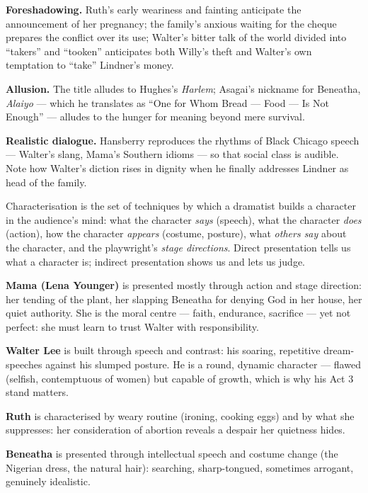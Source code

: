 \documentclass[11pt]{article}
\newcommand{\cle}[1]{{\popxbold\color{popdark}#1}}
\newcounter{popsec}
\newcounter{popsub}
\newcommand{\courssub}[1]{%
  \stepcounter{popsub}%
  \par\vspace{9pt}\noindent{\popxbold\fontsize{11.5}{13}\selectfont\color{popink}{\color{poporange}\thepopsec.\thepopsub}\hspace{6pt}#1}\par\nopagebreak\vspace{4pt}
}
\begin{document}
\textbf{Foreshadowing.} Ruth's early weariness and fainting anticipate the announcement of her pregnancy; the family's anxious waiting for the cheque prepares the conflict over its use; Walter's bitter talk of the world divided into ``takers'' and ``tooken'' anticipates both Willy's theft and Walter's own temptation to ``take'' Lindner's money.

\textbf{Allusion.} The title alludes to Hughes's \emph{Harlem}; Asagai's nickname for Beneatha, \emph{Alaiyo} --- which he translates as ``One for Whom Bread --- Food --- Is Not Enough'' --- alludes to the hunger for meaning beyond mere survival.

\textbf{Realistic dialogue.} Hansberry reproduces the rhythms of Black Chicago speech --- Walter's slang, Mama's Southern idioms --- so that social class is audible. Note how Walter's diction rises in dignity when he finally addresses Lindner as head of the family.

\courssub{Characterisation of the Whole Cast}

\begin{definition}[Characterisation]
\cle{Characterisation} is the set of techniques by which a dramatist builds a character in the audience's mind: what the character \emph{says} (speech), what the character \emph{does} (action), how the character \emph{appears} (costume, posture), what \emph{others say} about the character, and the playwright's \emph{stage directions}. Direct presentation tells us what a character is; indirect presentation shows us and lets us judge.
\end{definition}

\textbf{Mama (Lena Younger)} is presented mostly through action and stage direction: her tending of the plant, her slapping Beneatha for denying God in her house, her quiet authority. She is the moral centre --- faith, endurance, sacrifice --- yet not perfect: she must learn to trust Walter with responsibility.

\textbf{Walter Lee} is built through speech and contrast: his soaring, repetitive dream-speeches against his slumped posture. He is a round, dynamic character --- flawed (selfish, contemptuous of women) but capable of growth, which is why his Act 3 stand matters.

\textbf{Ruth} is characterised by weary routine (ironing, cooking eggs) and by what she suppresses: her consideration of abortion reveals a despair her quietness hides.

\textbf{Beneatha} is presented through intellectual speech and costume change (the Nigerian dress, the natural hair): searching, sharp-tongued, sometimes arrogant, genuinely idealistic.
\end{document}
